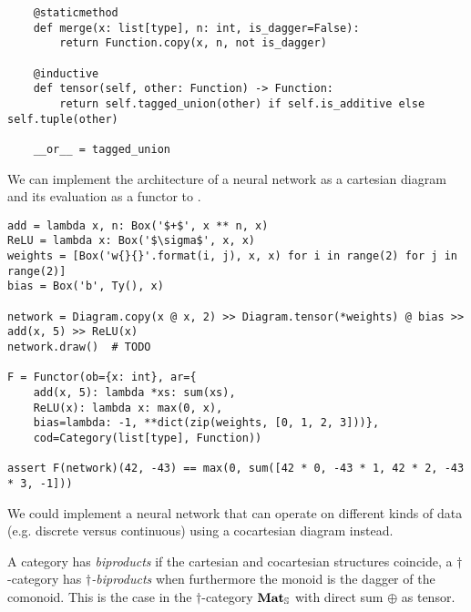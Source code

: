 \begin{python}
\begin{verbatim}
    @staticmethod
    def merge(x: list[type], n: int, is_dagger=False):
        return Function.copy(x, n, not is_dagger)

    @inductive
    def tensor(self, other: Function) -> Function:
        return self.tagged_union(other) if self.is_additive else self.tuple(other)

    __or__ = tagged_union
\end{verbatim}
\end{python}

\begin{example}
We can implement the architecture of a neural network as a cartesian diagram and its evaluation as a functor to .

\begin{verbatim}
add = lambda x, n: Box('$+$', x ** n, x)
ReLU = lambda x: Box('$\sigma$', x, x)
weights = [Box('w{}{}'.format(i, j), x, x) for i in range(2) for j in range(2)]
bias = Box('b', Ty(), x)

network = Diagram.copy(x @ x, 2) >> Diagram.tensor(*weights) @ bias >> add(x, 5) >> ReLU(x)
network.draw()  # TODO

F = Functor(ob={x: int}, ar={
    add(x, 5): lambda *xs: sum(xs),
    ReLU(x): lambda x: max(0, x),
    bias=lambda: -1, **dict(zip(weights, [0, 1, 2, 3]))},
    cod=Category(list[type], Function))

assert F(network)(42, -43) == max(0, sum([42 * 0, -43 * 1, 42 * 2, -43 * 3, -1]))
\end{verbatim}

We could implement a neural network that can operate on different kinds of data (e.g. discrete versus continuous) using a cocartesian diagram instead.
\end{example}

A category has \emph{biproducts} if the cartesian and cocartesian structures coincide,
a $\dagger$-category has \emph{$\dagger$-biproducts} when furthermore the monoid is the dagger of the comonoid.
This is the case in the $\dagger$-category $\mathbf{Mat}_\S$ with direct sum $\oplus$ as tensor.


